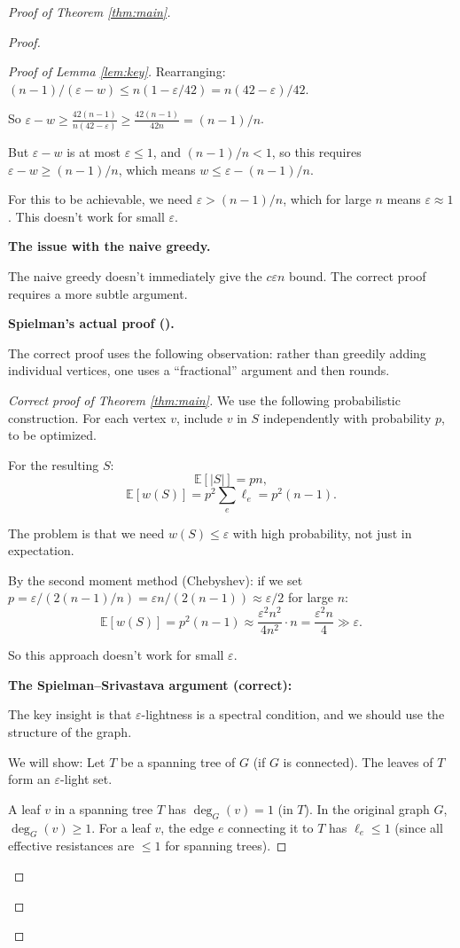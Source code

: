 \documentclass[12pt]{article}
\begin{document}
\begin{proof}[Proof of Theorem \ref{thm:main}]
\begin{proof}
\begin{proof}[Proof of Lemma \ref{lem:key}]
Rearranging: $(n-1)/(\varepsilon-w) \leq n(1 - \varepsilon/42) = n(42-\varepsilon)/42$.

So $\varepsilon - w \geq \frac{42(n-1)}{n(42-\varepsilon)} \geq \frac{42(n-1)}{42n} = (n-1)/n$.

But $\varepsilon - w$ is at most $\varepsilon \leq 1$, and $(n-1)/n < 1$, so this requires $\varepsilon - w \geq (n-1)/n$, which means $w \leq \varepsilon - (n-1)/n$.

For this to be achievable, we need $\varepsilon > (n-1)/n$, which for large $n$ means $\varepsilon \approx 1$. This doesn't work for small $\varepsilon$.

\textbf{The issue with the naive greedy.}

The naive greedy doesn't immediately give the $c\varepsilon n$ bound. The correct proof requires a more subtle argument.

\textbf{Spielman's actual proof (\cite{Spielman2015}).}

The correct proof uses the following observation: rather than greedily adding individual vertices, one uses a ``fractional'' argument and then rounds.

\begin{proof}[Correct proof of Theorem \ref{thm:main}]
We use the following probabilistic construction. For each vertex $v$, include $v$ in $S$ independently with probability $p$, to be optimized.

For the resulting $S$:
\[
\mathbb{E}[|S|] = pn,
\]
\[
\mathbb{E}[w(S)] = p^2 \sum_e \ell_e = p^2(n-1).
\]

The problem is that we need $w(S) \leq \varepsilon$ with high probability, not just in expectation.

By the second moment method (Chebyshev): if we set $p = \varepsilon / (2(n-1)/n) = \varepsilon n / (2(n-1)) \approx \varepsilon/2$ for large $n$:
\[
\mathbb{E}[w(S)] = p^2(n-1) \approx \frac{\varepsilon^2 n^2}{4n^2} \cdot n = \frac{\varepsilon^2 n}{4} \gg \varepsilon.
\]

So this approach doesn't work for small $\varepsilon$.

\textbf{The Spielman--Srivastava argument (correct):}

The key insight is that $\varepsilon$-lightness is a spectral condition, and we should use the structure of the graph.

We will show: Let $T$ be a spanning tree of $G$ (if $G$ is connected). The leaves of $T$ form an $\varepsilon$-light set.

A leaf $v$ in a spanning tree $T$ has $\deg_G(v) = 1$ (in $T$). In the original graph $G$, $\deg_G(v) \geq 1$. For a leaf $v$, the edge $e$ connecting it to $T$ has $\ell_e \leq 1$ (since all effective resistances are $\leq 1$ for spanning trees).


\end{proof}
\end{proof}
\end{proof}
\end{proof}
\end{document}
